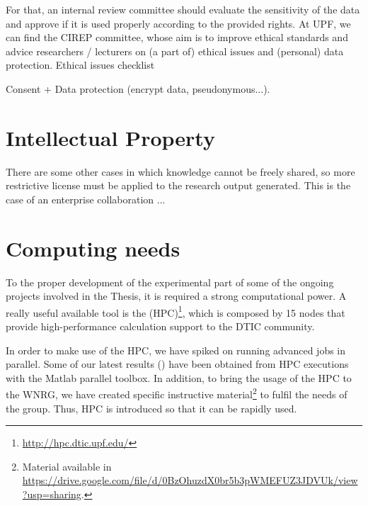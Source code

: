 \documentclass[12pt, a4paper,twoside]{article}
\begin{document}
	For that, an internal review committee should evaluate the sensitivity of the data and approve if it is used properly according to the provided rights. At UPF, we can find the CIREP committee, whose aim is to improve ethical standards and advice researchers / lecturers on (a part of) ethical issues and (personal) data protection. Ethical issues checklist
	
	Consent + Data protection (encrypt data, pseudonymous...).
		
	\section{Intellectual Property}
	\label{section:intellectual}	
	
	There are some other cases in which knowledge cannot be freely shared, so more restrictive license must be applied to the research output generated. This is the case of an enterprise collaboration ...
	
	\section{Computing needs}
	\label{section:computing}		
	To the proper development of the experimental part of some of the ongoing projects involved in the Thesis, it is required a strong computational power. A really useful available tool is the (HPC)\footnote{\url{http://hpc.dtic.upf.edu/}}, which is composed by 15 nodes that provide high-performance calculation support to the DTIC community. 
	
	In order to make use of the HPC, we have spiked on running advanced jobs in parallel. Some of our latest results (\cite{wilhelmi2017implications}) have been obtained from HPC executions with the Matlab parallel toolbox. In addition, to bring the usage of the HPC to the WNRG, we have created specific instructive material\footnote{Material available in \url{https://drive.google.com/file/d/0BzOhuzdX0br5b3pWMEFUZ3JDVUk/view?usp=sharing}.} to fulfil the needs of the group. Thus, HPC is introduced so that it can be rapidly used.	
		
\end{document}
